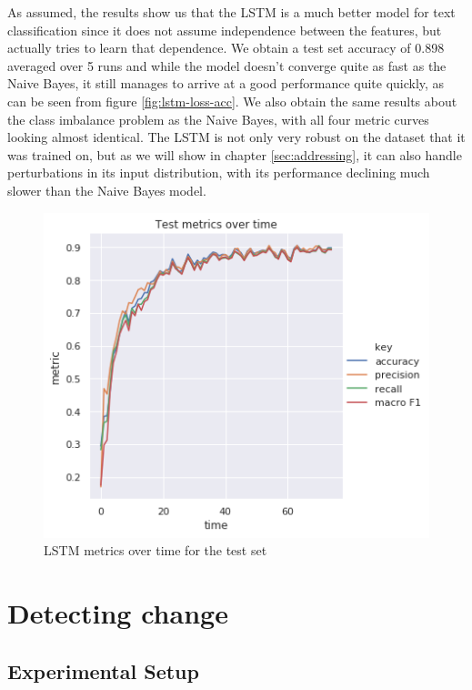 \documentclass[12pt]{extreport}
\begin{document}
As assumed, the results show us that the LSTM is a much better model for text classification since it does not assume independence between the features, but actually tries to learn that dependence. We obtain a test set accuracy of 0.898 averaged over 5 runs and while the model doesn't converge quite as fast as the Naive Bayes, it still manages to arrive at a good performance quite quickly, as can be seen from figure \ref{fig:lstm-loss-acc}. We also obtain the same results about the class imbalance problem as the Naive Bayes, with all four metric curves looking almost identical. The LSTM is not only very robust on the dataset that it was trained on, but as we will show in chapter \ref{sec:addressing}, it can also handle perturbations in its input distribution, with its performance declining much slower than the Naive Bayes model.

\begin{figure}[H]
\centering
\includegraphics[width=0.8\linewidth]{assets/framework/lstm_BERT_test_metrics_holdout.png}
\caption{LSTM metrics over time for the test set}
\label{fig:lstm-metrics}
\end{figure}

\chapter{Detecting change} \label{sec:detecting}

\section{Experimental Setup}
\end{document}
